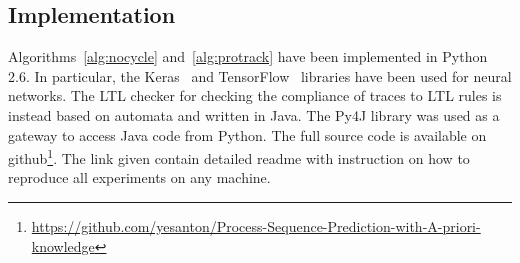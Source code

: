 



\subsection{Implementation}
\label{ssec:implementation}
Algorithms~\ref{alg:nocycle} and~\ref{alg:protrack} have been implemented in Python 2.6. In particular, the Keras~\cite{chollet2015keras} and TensorFlow~\cite{tensorflow2015-whitepaper} libraries have been used for neural networks. The LTL\cite{vanderAalst2005} checker for checking the compliance of traces to LTL rules is instead based on automata and written in Java. The Py4J library\cite{py4j} was used as a gateway to access Java code from Python.
The full source code is available on github\footnote{\url{https://github.com/yesanton/Process-Sequence-Prediction-with-A-priori-knowledge}}. The link given contain detailed readme with instruction on how to reproduce all experiments on any machine. 

